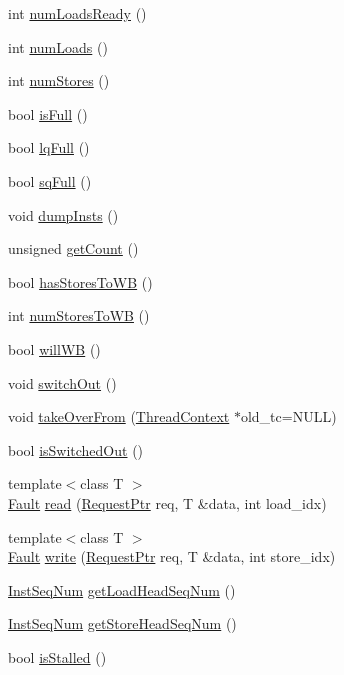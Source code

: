 \begin{DoxyCompactItemize}
\item 
int \hyperlink{classOzoneLWLSQ_a9aa5d5a61b2229931008ac2ea802a3ab}{numLoadsReady} ()
\item 
int \hyperlink{classOzoneLWLSQ_a54460b759fb06e2b18e26657279a6f49}{numLoads} ()
\item 
int \hyperlink{classOzoneLWLSQ_aa0fc32a4a9d77696f5907f4d25e7d07f}{numStores} ()
\item 
bool \hyperlink{classOzoneLWLSQ_a3e70330939fdfc4dbc2f60c1a660584d}{isFull} ()
\item 
bool \hyperlink{classOzoneLWLSQ_a5893daf623130be826f492bbff58f757}{lqFull} ()
\item 
bool \hyperlink{classOzoneLWLSQ_a477981d1f905d2d398a1527f7149e3c4}{sqFull} ()
\item 
void \hyperlink{classOzoneLWLSQ_a80587b4fe043bbe1995536cb3b361588}{dumpInsts} ()
\item 
unsigned \hyperlink{classOzoneLWLSQ_a24ba9cb3fa1e726321780a20a960c8cd}{getCount} ()
\item 
bool \hyperlink{classOzoneLWLSQ_ad2e4b46255cfb53e85522adeed4e2089}{hasStoresToWB} ()
\item 
int \hyperlink{classOzoneLWLSQ_a276cdbdaf4551f1b846c4e2535c5f882}{numStoresToWB} ()
\item 
bool \hyperlink{classOzoneLWLSQ_a338be821734603396bfef8d9fb8f04b0}{willWB} ()
\item 
void \hyperlink{classOzoneLWLSQ_a05f299b443f8cc73a93d61572edc0218}{switchOut} ()
\item 
void \hyperlink{classOzoneLWLSQ_a5a901e7ec5b94a55bd61fde88ad0b7f1}{takeOverFrom} (\hyperlink{classThreadContext}{ThreadContext} $\ast$old\_\-tc=NULL)
\item 
bool \hyperlink{classOzoneLWLSQ_a471165257f311a78136ce991a3bad31a}{isSwitchedOut} ()
\item 
{\footnotesize template$<$class T $>$ }\\\hyperlink{classRefCountingPtr}{Fault} \hyperlink{classOzoneLWLSQ_a0747777ac998dabdc20fa0c554d378d3}{read} (\hyperlink{classRequest}{RequestPtr} req, T \&data, int load\_\-idx)
\item 
{\footnotesize template$<$class T $>$ }\\\hyperlink{classRefCountingPtr}{Fault} \hyperlink{classOzoneLWLSQ_abbf7bcc93511421a1787650a43e2642a}{write} (\hyperlink{classRequest}{RequestPtr} req, T \&data, int store\_\-idx)
\item 
\hyperlink{inst__seq_8hh_a258d93d98edaedee089435c19ea2ea2e}{InstSeqNum} \hyperlink{classOzoneLWLSQ_aee7352adadc6b43b7ce36a8c052eb222}{getLoadHeadSeqNum} ()
\item 
\hyperlink{inst__seq_8hh_a258d93d98edaedee089435c19ea2ea2e}{InstSeqNum} \hyperlink{classOzoneLWLSQ_a1813b58ab7569d6aeefb5d4e235cceda}{getStoreHeadSeqNum} ()
\item 
bool \hyperlink{classOzoneLWLSQ_af8eb8590fbfa6ecd2f796390677a4c00}{isStalled} ()
\end{DoxyCompactItemize}

